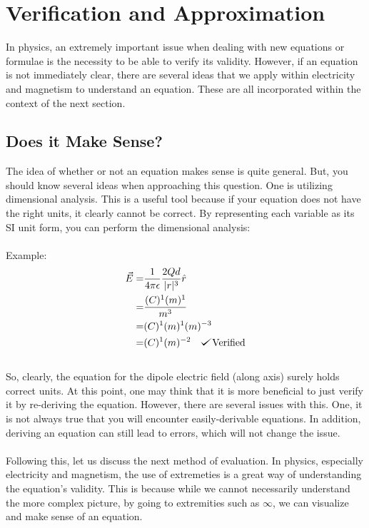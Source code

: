 \documentclass{article}
\def\checkmark{\tikz\fill[scale=0.4](0,.35) -- (.25,0) -- (1,.7) -- (.25,.15) -- cycle;}
\begin{document}
\pagebreak

\section{Verification and Approximation}
In physics, an extremely important issue when dealing with new equations or formulae is the necessity to be able to verify its validity. However, if an equation is not immediately clear, there are several ideas that we apply within electricity and magnetism to understand an equation. These are all incorporated within the context of the next section.
\subsection{Does it Make Sense?}
The idea of whether or not an equation makes sense is quite general. But, you should know several ideas when approaching this question. One is utilizing dimensional analysis. This is a useful tool because if your equation does not have the right units, it clearly cannot be correct. By representing each variable as its SI unit form, you can perform the dimensional analysis:\\
\\
Example:
\begin{align*}
	\vec{E} =& \frac{1}{4\pi\epsilon}\frac{2Qd}{|r|^3}\hat{r}\\
	=& \frac{(C)^1(m)^1}{m^3}\\
	=& (C)^1(m)^1(m)^{-3}\\
	=& (C)^1(m)^{-2} \ \ \ \checkmark \text{Verified}
\end{align*}\\
So, clearly, the equation for the dipole electric field (along axis) surely holds correct units. At this point, one may think that it is more beneficial to just verify it by re-deriving the equation. However, there are several issues with this. One, it is not always true that you will encounter easily-derivable equations. In addition, deriving an equation can still lead to errors, which will not change the issue. \\
\\
Following this, let us discuss the next method of evaluation. In physics, especially electricity and magnetism, the use of extremeties is a great way of understanding the equation's validity. This is because while we cannot necessarily understand the more complex picture, by going to extremities such as $\infty$, we can visualize and make sense of an equation.\\
\end{document}
